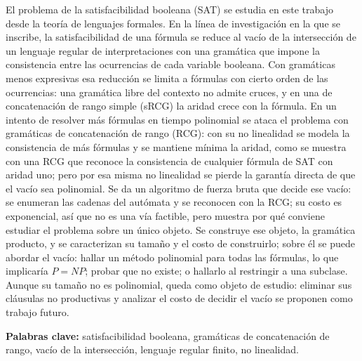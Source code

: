 \begin{resumen}

El problema de la satisfacibilidad booleana (SAT) se estudia en este
trabajo desde la teoría de lenguajes formales. En la línea de
investigación en la que se inscribe, la satisfacibilidad de una fórmula
se reduce al vacío de la intersección de un lenguaje regular de
interpretaciones con una gramática que impone la consistencia entre las
ocurrencias de cada variable booleana.
Con gramáticas menos expresivas esa reducción se limita a fórmulas con
cierto orden de las ocurrencias: una gramática libre del contexto no
admite cruces, y en una de concatenación de rango simple (sRCG) la aridad
crece con la fórmula. En un intento de resolver más fórmulas en tiempo
polinomial se ataca el problema con gramáticas de concatenación de rango
(RCG): con su no linealidad se modela la consistencia de más fórmulas y
se mantiene mínima la aridad, como se muestra con una RCG que reconoce la
consistencia de cualquier fórmula de SAT con aridad uno; pero por esa
misma no linealidad se pierde la garantía directa de que el vacío sea
polinomial.
Se da un algoritmo de fuerza bruta que decide ese vacío: se enumeran las
cadenas del autómata y se reconocen con la RCG; su costo es exponencial,
así que
no es una vía factible, pero muestra por qué conviene estudiar el
problema sobre un único objeto. Se construye ese objeto, la gramática
producto, y se caracterizan su tamaño y el costo de construirlo; sobre él
se puede abordar el vacío: hallar un método polinomial para todas las
fórmulas, lo que implicaría $P = NP$; probar que no existe; o hallarlo al
restringir a una subclase. Aunque su
tamaño no es polinomial, queda como objeto de estudio: eliminar sus
cláusulas no productivas y analizar el costo de decidir el vacío se
proponen como trabajo futuro.

\vspace{1em}
\noindent\textbf{Palabras clave:} satisfacibilidad booleana, gramáticas
de concatenación de rango, vacío de la intersección, lenguaje regular
finito, no linealidad.

\end{resumen}

